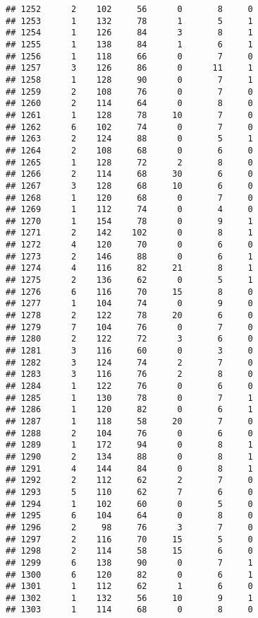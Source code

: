 \documentclass[
]{article}
\begin{document}
\begin{verbatim}
## 1252      2    102     56      0       8     0
## 1253      1    132     78      1       5     1
## 1254      1    126     84      3       8     1
## 1255      1    138     84      1       6     1
## 1256      1    118     66      0       7     0
## 1257      3    126     86      0      11     1
## 1258      1    128     90      0       7     1
## 1259      2    108     76      0       7     0
## 1260      2    114     64      0       8     0
## 1261      1    128     78     10       7     0
## 1262      6    102     74      0       7     0
## 1263      2    124     88      0       5     1
## 1264      2    108     68      0       6     0
## 1265      1    128     72      2       8     0
## 1266      2    114     68     30       6     0
## 1267      3    128     68     10       6     0
## 1268      1    120     68      0       7     0
## 1269      1    112     74      0       4     0
## 1270      1    154     78      0       9     1
## 1271      2    142    102      0       8     1
## 1272      4    120     70      0       6     0
## 1273      2    146     88      0       6     1
## 1274      4    116     82     21       8     1
## 1275      2    136     62      0       5     1
## 1276      6    116     70     15       8     0
## 1277      1    104     74      0       9     0
## 1278      2    122     78     20       6     0
## 1279      7    104     76      0       7     0
## 1280      2    122     72      3       6     0
## 1281      3    116     60      0       3     0
## 1282      3    124     74      2       7     0
## 1283      3    116     76      2       8     0
## 1284      1    122     76      0       6     0
## 1285      1    130     78      0       7     1
## 1286      1    120     82      0       6     1
## 1287      1    118     58     20       7     0
## 1288      2    104     76      0       6     0
## 1289      1    172     94      0       8     1
## 1290      2    134     88      0       8     1
## 1291      4    144     84      0       8     1
## 1292      2    112     62      2       7     0
## 1293      5    110     62      7       6     0
## 1294      1    102     60      0       5     0
## 1295      6    104     64      0       8     0
## 1296      2     98     76      3       7     0
## 1297      2    116     70     15       5     0
## 1298      2    114     58     15       6     0
## 1299      6    138     90      0       7     1
## 1300      6    120     82      0       6     1
## 1301      1    112     62      1       6     0
## 1302      1    132     56     10       9     1
## 1303      1    114     68      0       8     0

\end{verbatim}
\end{document}
